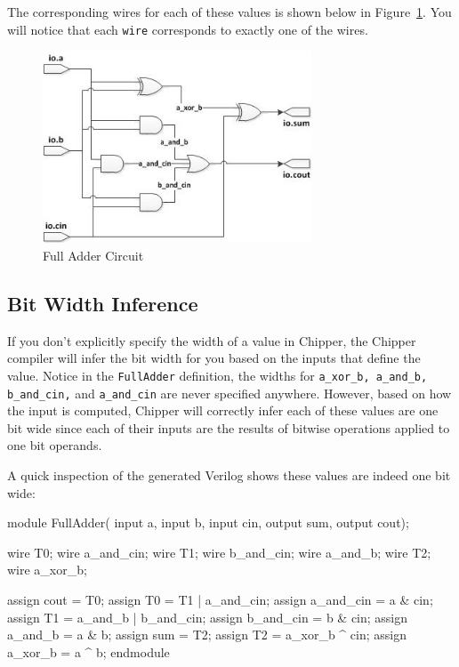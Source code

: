 The corresponding wires for each of these values is shown below in Figure~\ref{fig:full-adder}.  You will notice that each \verb+wire+ corresponds to exactly one of the wires.

\begin{figure}[ht!]
\centering
\includegraphics[width=80mm]{figs/Full_Adder.jpg}
\caption{Full Adder Circuit}
\label{fig:full-adder}
\end{figure}


\subsection{Bit Width Inference}

If you don't explicitly specify the width of a value in Chipper, the Chipper compiler will infer the bit width for you based on the inputs that define the value. Notice in the \verb+FullAdder+ definition, the widths for \verb+a_xor_b, a_and_b, b_and_cin,+ and \verb+a_and_cin+ are never specified anywhere. However, based on how the input is computed, Chipper will correctly infer each of these values are one bit wide since each of their inputs are the results of bitwise operations applied to one bit operands.

A quick inspection of the generated Verilog shows these values are indeed one bit wide:

\begin{bash}
module FullAdder(
    input  a,
    input  b,
    input  cin,
    output sum,
    output cout);

  wire T0;
  wire a_and_cin;
  wire T1;
  wire b_and_cin;
  wire a_and_b;
  wire T2;
  wire a_xor_b;

  assign cout = T0;
  assign T0 = T1 | a_and_cin;
  assign a_and_cin = a & cin;
  assign T1 = a_and_b | b_and_cin;
  assign b_and_cin = b & cin;
  assign a_and_b = a & b;
  assign sum = T2;
  assign T2 = a_xor_b ^ cin;
  assign a_xor_b = a ^ b;
endmodule
\end{bash}

